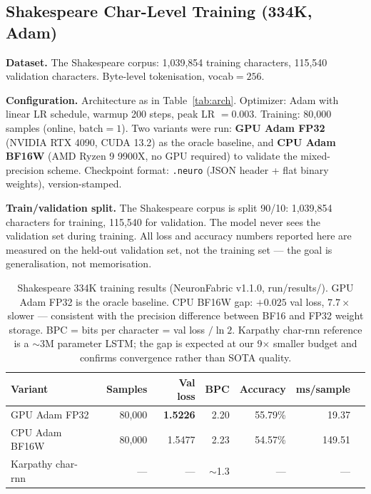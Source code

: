 \documentclass[11pt]{article}
\newcommand{\bfsixteenloss}{0.025}
\newcommand{\gpuvaloss}{1.5226}
\newcommand{\cpubfvaloss}{1.5477}
\newcommand{\repoversion}{v1.1.0}
\begin{document}
\subsection{Shakespeare Char-Level Training (334K, Adam)}

\textbf{Dataset.} The Shakespeare corpus: 1,039,854 training characters,
115,540 validation characters. Byte-level tokenisation, vocab$=256$.

\textbf{Configuration.} Architecture as in Table~\ref{tab:arch}.
Optimizer: Adam with linear LR schedule, warmup 200 steps, peak LR $= 0.003$.
Training: 80,000 samples (online, batch$=1$).
Two variants were run: \textbf{GPU Adam FP32} (NVIDIA RTX 4090, CUDA 13.2) as the oracle
baseline, and \textbf{CPU Adam BF16W} (AMD Ryzen 9 9900X, no GPU required) to validate
the mixed-precision scheme.
Checkpoint format: \texttt{.neuro} (JSON header + flat binary weights), version-stamped.

\textbf{Train/validation split.} The Shakespeare corpus is split 90/10:
1,039,854 characters for training, 115,540 for validation.
The model never sees the validation set during training.
All loss and accuracy numbers reported here are measured on the held-out validation set,
not the training set --- the goal is generalisation, not memorisation.

\begin{table}[H]
\centering
\begin{tabular}{lrrrrrr}
\toprule
Variant & Samples & Val loss & BPC & Accuracy & ms/sample \\
\midrule
GPU Adam FP32  & 80,000 & \textbf{\gpuvaloss} & 2.20 & 55.79\% & 19.37 \\
    CPU Adam BF16W & 80,000 & \cpubfvaloss & 2.23 & 54.57\% & 149.51 \\
\midrule
Karpathy char-rnn~\cite{karpathy2015charrnn} & --- & --- & $\sim$1.3 & --- & --- \\
\bottomrule
\end{tabular}
\caption{Shakespeare 334K training results (NeuronFabric \repoversion, run/results/).
GPU Adam FP32 is the oracle baseline.
CPU BF16W gap: $+\bfsixteenloss$ val loss, $7.7\times$ slower --- consistent with the precision difference between BF16 and FP32 weight storage.
BPC = bits per character = val loss $/ \ln 2$. Karpathy char-rnn reference is a $\sim$3M parameter LSTM; the gap is expected at our 9$\times$ smaller budget and confirms convergence rather than SOTA quality.}
\label{tab:shakespeare-results}
\end{table}
\end{document}
